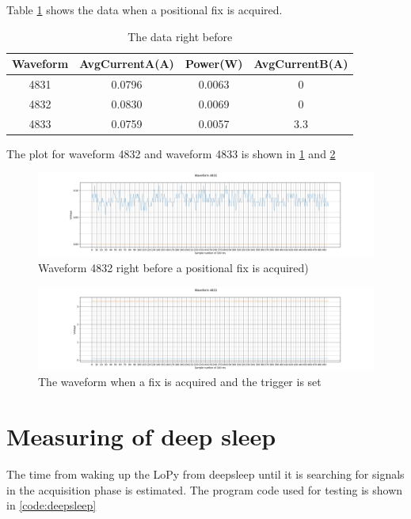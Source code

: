 Table \ref{Table:wifioff} shows the data when a positional fix is acquired.  
\begin{table}[h!]
\begin{center}
 \begin{tabular}{||c c c c||} 
 \hline
 Waveform & AvgCurrentA(A) & Power(W) & AvgCurrentB(A) \\ [0.5ex] 
 \hline\hline
 4831 & 0.0796 & 0.0063 & 0 \\ 
 \hline
 4832 & 0.0830 & 0.0069 & 0 \\
 \hline
 4833 & 0.0759  & 0.0057 & 3.3 \\[1ex]
 \hline
\end{tabular}
\end{center}
\caption{The data right before}
\label{Table:wifioff}
\end{table}

The plot for waveform 4832 and waveform 4833 is shown in \ref{fig:4832} and \ref{fig:4833}
\begin{figure}[H]
\centering
\includegraphics[width=16 cm]{Project_Report/Images/4832.png}
\caption{Waveform 4832 right before a positional fix is acquired)}
\label{fig:4832}
\end{figure}

\begin{figure}[H]
\centering
\includegraphics[width=16 cm]{Project_Report/Images/4833.png}
\caption{The waveform when a fix is acquired and the trigger is set}
\label{fig:4833}
\end{figure}




\section{Measuring of deep sleep}
The time from waking up the LoPy from deepsleep until it is searching for signals in the acquisition phase is estimated. The program code used for testing is shown in \ref{code:deepsleep}

